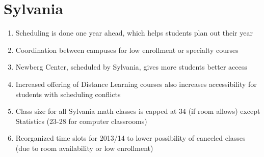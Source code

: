 \section{Sylvania}
\begin{enumerate}
	\item  Scheduling is done one year ahead, which helps students plan out their year
	\item  Coordination between campuses for low enrollment or specialty courses 
	\item  Newberg Center, scheduled by Sylvania, gives more students better access 
	\item  Increased offering of Distance Learning courses also increases accessibility for 
	students with scheduling conflicts
	\item  Class size for all Sylvania math classes is capped at 34 (if room allows) except
	Statistics (23-28 for computer classrooms)
	\item  Reorganized time slots for 2013/14 to lower possibility of canceled classes (due 
	to room availability or low enrollment)
\end{enumerate}
